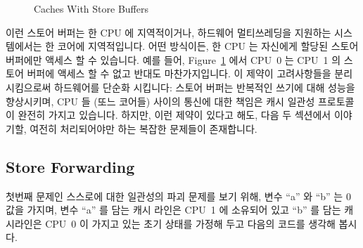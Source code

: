 \begin{figure}[htb]
\centering
{}
\caption{Caches With Store Buffers}
\label{fig:app:whymb:Caches With Store Buffers}
\end{figure}

이런 스토어 버퍼는 한 CPU 에 지역적이거나, 하드웨어 멀티쓰레딩을 지원하는
시스템에서는 한 코어에 지역적입니다.
어떤 방식이든, 한 CPU 는 자신에게 할당된 스토어 버퍼에만 액세스 할 수 있습니다.
예를 들어, Figure~\ref{fig:app:whymb:Caches With Store Buffers} 에서 CPU~0 는
CPU~1 의 스토어 버퍼에 액세스 할 수 없고 반대도 마찬가지입니다.
이 제약이 고려사항들을 분리시킴으로써 하드웨어를 단순화 시킵니다: 스토어 버퍼는
반복적인 쓰기에 대해 성능을 향상시키며, CPU 들 (또느 코어들) 사이의 통신에 대한
책임은 캐시 일관성 프로토콜이 완전히 가지고 있습니다.
하지만, 이런 제약이 있다고 해도, 다음 두 섹션에서 이야기할, 여전히 처리되어야만
하는 복잡한 문제들이 존재합니다.
\iffalse

These store buffers are local to a given CPU or, on systems with
hardware multithreading, local to a given core.
Either way, a given CPU is permitted to access only the store buffer
assigned to it.
For example, in
Figure~\ref{fig:app:whymb:Caches With Store Buffers}, CPU~0 cannot
access CPU~1's store buffer and vice versa.
This restriction simplifies the hardware by separating concerns:
The store buffer improves performance for consecutive writes, while
the responsibility for communicating among CPUs (or cores, as the
case may be) is fully shouldered by the cache-coherence protocol.
However, even given this restriction, there are complications that must
be addressed, which are covered in the next two sections.
\fi

\subsection{Store Forwarding}
\label{sec:app:whymb:Store Forwarding}

첫번째 문제인 스스로에 대한 일관성의 파괴 문제를 보기 위해, 변수 ``a'' 와 ``b''
는 0 값을 가지며, 변수 ``a'' 를 담는 캐시 라인은 CPU~1 에 소유되어 있고 ``b''
를 담는 캐시라인은 CPU~0 이 가지고 있는 초기 상태를 가정해 두고 다음의 코드를
생각해 봅시다.
\iffalse

To see the first complication, a violation of self-consistency,
consider the following code with variables ``a'' and ``b'' both initially
zero, and with the cache line containing variable ``a'' initially
owned by CPU~1 and that containing ``b'' initially owned by CPU~0:
\fi

